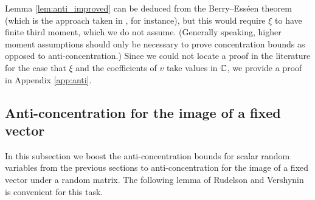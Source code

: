 \documentclass[aop,preprint]{imsart}
\theoremstyle{plain}
\theoremstyle{definition}
\theoremstyle{remark}
\newtheorem{remark}[theorem]{Remark}
\numberwithin{equation}{section}
\numberwithin{theorem}{section}
\def \re {\mathrm{Re}}
\begin{document}
\begin{comment}
\Blue{May omit.}
\begin{remark}
Since $\xi$ and the coefficients of $v$ are complex one would expect a bound with $r^2$ in place of $r$ on the right hand side of \eqref{be:1d}, provided the set of phases of the components of $v$ is in some sense ``genuinely two dimensional".
Indeed, by a modification of the proof below one can show
\begin{equation}
p_{\xi,v}(r) \ll_\kappa \frac1{\alpha^2} (r^2 + \|v\|_\infty^2)
\end{equation}
for all $r\ge 0$, provided $v$ satisfies
\begin{equation}	\label{disaligned} 
\inf_{\theta\in \R}\|\re(e^{i\theta}v)\| \ge \alpha\|v\|
\end{equation}
for some $\alpha>0$. 
The condition \eqref{disaligned} was used in a more sophisticated anti-concentration bound of Rudelson and Vershynin -- see \cite[Theorem 3.3]{RuVe:rectangular}.
We will not need such improvements in the present work.
\end{remark}
\end{comment}

Lemma \ref{lem:anti_improved} can be deduced from the Berry--Ess\'een theorem (which is the approach taken in \citep{LPRT}, for instance), but this would require $\xi$ to have finite third moment, which we do not assume. 
(Generally speaking, higher moment assumptions should only be necessary to prove concentration bounds as opposed to anti-concentration.) 
Since we could not locate a proof in the literature for the case that $\xi$ 
and
%
the coefficients of $v$ take values in ${\mathbb C}$, we provide a proof in 
Appendix \ref{app:anti}. 



\subsection{Anti-concentration for the image of a fixed vector}	\label{sec:image}

In this subsection we boost the anti-concentration bounds for scalar random variables from the previous sections to anti-concentration for the image of a fixed vector under a random matrix.
The following lemma of Rudelson and Vershynin is convenient for this task.
\end{document}
